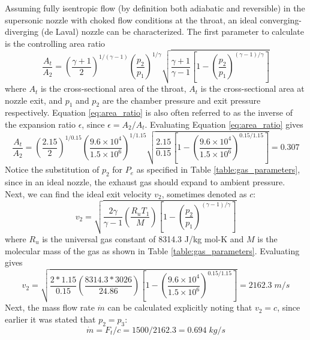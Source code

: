 \documentclass[9pt]{article} %
\numberwithin{equation}{section} %
\begin{document}
Assuming fully isentropic flow (by definition both adiabatic and reversible) in the supersonic nozzle with choked flow conditions at the throat, an ideal converging-diverging (de Laval) nozzle can be characterized. The first parameter to calculate is the controlling area ratio
\begin{equation} \label{eq:area_ratio}
\frac{A_{t}}{A_{2}} = \left( \frac{\gamma + 1}{2} \right) ^{1/(\gamma - 1)} \left( \frac{p_{2}}{p_{1}} \right) ^{1/\gamma} \sqrt{ \frac{\gamma + 1}{\gamma - 1} \left[ 1 - \left( \frac{p_{2}}{p_{1}} \right) ^{(\gamma - 1)/\gamma} \right] }
\end{equation}
where $A_{t}$ is the cross-sectional area of the throat, $A_{t}$ is the cross-sectional area at nozzle exit, and $p_{1}$ and $p_{2}$ are the chamber pressure and exit pressure respectively. Equation \ref{eq:area_ratio} is also often referred to as the inverse of the expansion ratio $\epsilon$, since $\epsilon = A_{2}/A_{t}$. Evaluating Equation \ref{eq:area_ratio} gives
\begin{equation*} 
\frac{A_{t}}{A_{2}} = \left( \frac{2.15}{2} \right) ^{1/0.15} \left( \frac{9.6 \times 10^{4}}{1.5 \times 10^{6}} \right) ^{1/1.15} \sqrt{ \frac{2.15}{0.15} \left[ 1 - \left( \frac{9.6 \times 10^{4}}{1.5 \times 10^{6}} \right) ^{0.15/1.15} \right] } = 0.307
\end{equation*}
Notice the substitution of $p_{2}$ for $P_{e}$ as specified in Table \ref{table:gas_parameters}, since in an ideal nozzle, the exhaust gas should expand to ambient pressure. Next, we can find the ideal exit velocity $v_{2}$, sometimes denoted as $c$:
\begin{equation} \label{eq:exit_velocity}
v_{2} = \sqrt{ \frac{2\gamma}{\gamma - 1} \left( \frac{R_{u}T_{1}}{M} \right) \left[ 1- \left( \frac{p_{2}}{p_{1}} \right) ^{(\gamma - 1)/\gamma} \right] }
\end{equation}
where $R_{u}$ is the universal gas constant of 8314.3 J/kg mol-K and $M$ is the molecular mass of the gas as shown in Table \ref{table:gas_parameters}. Evaluating gives
\begin{equation*} 
v_{2} = \sqrt{ \frac{2 * 1.15}{0.15} \left( \frac{8314.3 * 3026}{24.86} \right) \left[ 1- \left( \frac{9.6 \times 10^{4}}{1.5 \times 10^{6}} \right) ^{0.15/1.15} \right] } = 2162.3 \; m/s
\end{equation*}
Next, the mass flow rate $\dot{m}$ can be calculated explicitly noting that $v_{2} = c$, since earlier it was stated that $p_{2} = p_{3}$:
\begin{equation} \label{eq:mdot}
\dot{m} = F_{t}/c = 1500/2162.3 = 0.694 \; kg/s
\end{equation}
\end{document}
